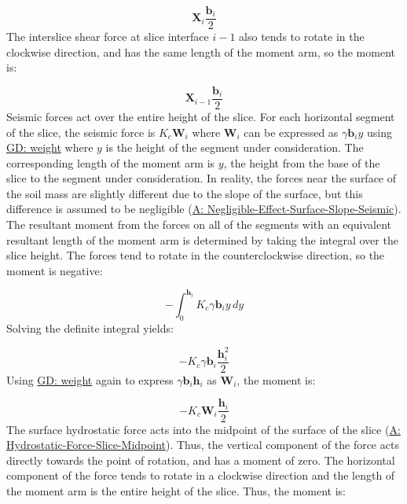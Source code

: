 \documentclass[12pt]{article}
\begin{document}
\begin{displaymath}
{\mathbf{X}}_{i} \frac{{\mathbf{b}}_{i}}{2}
\end{displaymath}
The interslice shear force at slice interface $i-1$ also tends to rotate in the clockwise direction, and has the same length of the moment arm, so the moment is:

\begin{displaymath}
{\mathbf{X}}_{i-1} \frac{{\mathbf{b}}_{i}}{2}
\end{displaymath}
Seismic forces act over the entire height of the slice. For each horizontal segment of the slice, the seismic force is ${K_{c}} {\mathbf{W}}_{i}$ where ${\mathbf{W}}_{i}$ can be expressed as $γ {\mathbf{b}}_{i} y$ using \hyperref[GD:weight]{GD: weight} where $y$ is the height of the segment under consideration. The corresponding length of the moment arm is $y$, the height from the base of the slice to the segment under consideration. In reality, the forces near the surface of the soil mass are slightly different due to the slope of the surface, but this difference is assumed to be negligible (\hyperref[assumpNESSS]{A: Negligible-Effect-Surface-Slope-Seismic}). The resultant moment from the forces on all of the segments with an equivalent resultant length of the moment arm is determined by taking the integral over the slice height. The forces tend to rotate in the counterclockwise direction, so the moment is negative:

\begin{displaymath}
-\int_{0}^{{\mathbf{h}}_{i}}{{K_{c}} γ {\mathbf{b}}_{i} y}\,dy
\end{displaymath}
Solving the definite integral yields:

\begin{displaymath}
-{K_{c}} γ {\mathbf{b}}_{i} \frac{{\mathbf{h}}_{i}^{2}}{2}
\end{displaymath}
Using \hyperref[GD:weight]{GD: weight} again to express $γ {\mathbf{b}}_{i} {\mathbf{h}}_{i}$ as ${\mathbf{W}}_{i}$, the moment is:

\begin{displaymath}
-{K_{c}} {\mathbf{W}}_{i} \frac{{\mathbf{h}}_{i}}{2}
\end{displaymath}
The surface hydrostatic force acts into the midpoint of the surface of the slice (\hyperref[assumpHFSM]{A: Hydrostatic-Force-Slice-Midpoint}). Thus, the vertical component of the force acts directly towards the point of rotation, and has a moment of zero. The horizontal component of the force tends to rotate in a clockwise direction and the length of the moment arm is the entire height of the slice. Thus, the moment is:
\end{document}
